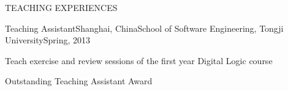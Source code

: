 \documentclass{resume} %
\begin{document}

\begin{rSection}{TEACHING EXPERIENCES}

  \begin{rSubsection}{Teaching Assistant}{Shanghai, China}{School of Software Engineering, Tongji University}{Spring, 2013}
  \item Teach exercise and review sessions of the first year Digital Logic course
    \item Outstanding Teaching Assistant Award
  \end{rSubsection}

\end{rSection}

\end{document}
